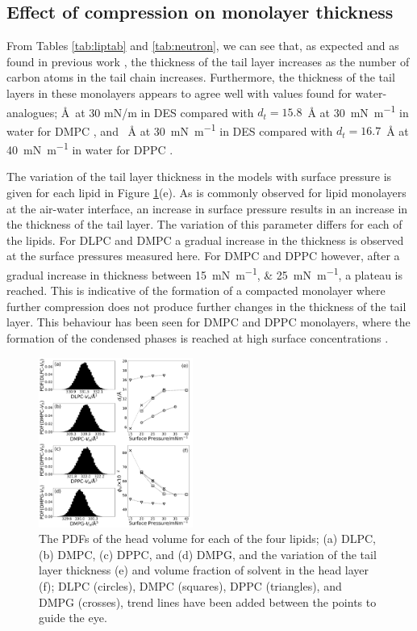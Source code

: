 \documentclass[amsmath,amssymb,twocolumn,superscriptaddress]{revtex4-1}
\begin{document}
\subsection{Effect of compression on monolayer thickness}
%
From Tables \ref{tab:liptab} and \ref{tab:neutron}, we can see that, as expected and as found in previous work \cite{mohwald_phospholipid_1990,vaknin_structural_1991}, the thickness of the tail layer increases as the number of carbon atoms in the tail chain increases.
Furthermore, the thickness of the tail layers in these monolayers appears to agree well with values found for water-analogues; \AA\ at 30 mN/m in DES compared with $d_t=15.8$~\si{\angstrom} at \SI{30}{\milli\newton\per\meter} in water for DMPC \cite{johnson_structure_1991}, and ~\si{\angstrom} at \SI{30}{\milli\newton\per\meter} in DES compared with $d_t=16.7$~\si{\angstrom} at \SI{40}{\milli\newton\per\meter} in water for DPPC \cite{helm_phospholipid_1987}.

The variation of the tail layer thickness in the models with surface pressure is given for each lipid in Figure \ref{fig:lipresults}(e).
As is commonly observed for lipid monolayers at the air-water interface, an increase in surface pressure results in an increase in the thickness of the tail layer.
The variation of this parameter differs for each of the lipids.
For DLPC and DMPC a gradual increase in the thickness is observed at the surface pressures measured here.
For DMPC and DPPC however, after a gradual increase in thickness between \SIlist{15;25}{\milli\newton\per\meter}, a plateau is reached.
This is indicative of the formation of a compacted monolayer where further compression does not produce further changes in the thickness of the tail layer.
This behaviour has been seen for DMPC and DPPC monolayers, where the formation of the condensed phases is reached at high surface concentrations \cite{mohwald_phospholipid_1990}.
%
\begin{figure}
    \centering
    \includegraphics[width=0.45\textwidth]{figures/vh_dt_phih}
    \caption{\small The PDFs of the head volume for each of the four lipids; (a) DLPC, (b) DMPC, (c) DPPC, and (d) DMPG, and the variation of the tail layer thickness (e) and volume fraction of solvent in the head layer (f); DLPC (circles), DMPC (squares), DPPC (triangles), and DMPG (crosses), trend lines have been added between the points to guide the eye.}
    \label{fig:lipresults}
\end{figure}
%
\end{document}
